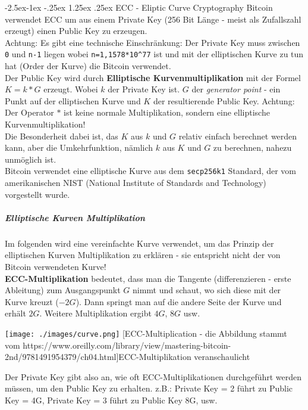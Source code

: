 \documentclass[10pt,a4paper,titlepage]{article}
\makeatletter
\renewcommand\paragraph{\@startsection{paragraph}{4}{\z@}%
            {-2.5ex\@plus -1ex \@minus -.25ex}%
            {1.25ex \@plus .25ex}%
            {\normalfont\normalsize\bfseries}}
\makeatother
\begin{document}
\paragraph{ECC - Eliptic Curve Cryptography} \label{ECC}
Bitcoin verwendet ECC um aus einem Private Key (256 Bit Länge - meist als Zufallszahl erzeugt) einen Public Key zu erzeugen.\\
Achtung: Es gibt eine technische Einschränkung: Der Private Key muss zwischen \verb|0| und \verb|n-1| liegen wobei \verb|n=1,1578*10^77| ist und mit der elliptischen Kurve zu tun hat (Order der Kurve) die Bitcoin verwendet.\\
Der Public Key wird durch \textbf{Elliptische Kurvenmultiplikation} mit der Formel $K=k*G$ erzeugt. Wobei $k$ der Private Key ist. $G$ der \textit{generator point} - ein Punkt auf der elliptischen Kurve und $K$ der resultierende Public Key. Achtung: Der Operator $*$ ist keine normale Multiplikation, sondern eine elliptische Kurvenmultiplikation!\\
Die Besonderheit dabei ist, das $K$ aus $k$ und $G$ relativ einfach berechnet werden kann, aber die Umkehrfunktion, nämlich $k$ aus $K$ und $G$ zu berechnen, nahezu unmöglich ist.\\
Bitcoin verwendet eine elliptische Kurve aus dem \verb|secp256k1| Standard, der vom amerikanischen NIST (National Institute of Standards and Technology) vorgestellt wurde.\\
\subparagraph{Elliptische Kurven Multiplikation}
Im folgenden wird eine vereinfachte Kurve verwendet, um das Prinzip der elliptischen Kurven Multiplikation zu erklären - sie entspricht nicht der von Bitcoin verwendeten Kurve!\\
\textbf{ECC-Multiplikation} bedeutet, dass man die Tangente (differenzieren - erste Ableitung) zum Ausgangspunkt $G$ nimmt und schaut, wo sich diese mit der Kurve kreuzt ($-2G$). Dann springt man auf die andere Seite der Kurve und erhält $2G$. Weitere Multiplikation ergibt $4G$, $8G$ usw.
\begin{center}
\texttt{[image: ./images/curve.png]}
[ECC-Multiplication - die Abbildung stammt vom https://www.oreilly.com/library/view/mastering-bitcoin-2nd/9781491954379/ch04.html]{ECC-Multiplikation veranschaulicht}
\end{center}
Der Private Key gibt also an, wie oft ECC-Multiplikationen durchgeführt werden müssen, um den Public Key zu erhalten.
z.B.: Private Key = 2 führt zu Public Key = 4G, Private Key = 3 führt zu Public Key 8G, usw.
\end{document}
